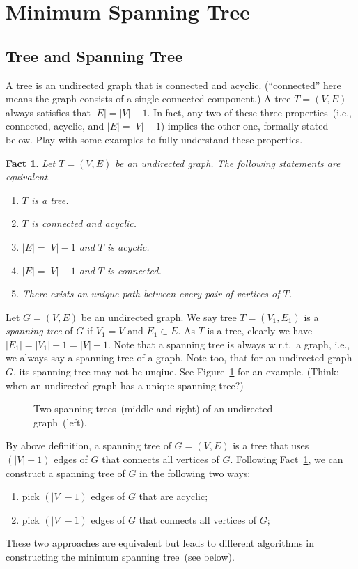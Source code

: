 \documentclass[letterpaper,11pt]{article}
\theoremstyle{mytheorem}
\newtheorem{fact}{Fact}
\begin{document}
\section*{Minimum Spanning Tree}

\subsection*{Tree and Spanning Tree}

A tree is an undirected graph that is connected and acyclic.
(``connected'' here means the graph consists of a single connected component.)
A tree $T = (V, E)$ always satisfies that $|E| = |V| - 1$.
In fact, any two of these three properties~(i.e., connected, acyclic, and $|E| = |V| - 1$)
implies the other one, formally stated below. Play with some examples
to fully understand these properties.

\begin{fact}\label{fact1}
Let $T = (V, E)$ be an undirected graph. The following statements are equivalent.
\vspace*{-\topsep}
\begin{enumerate}
\item $T$ is a tree.
\item $T$ is connected and acyclic.
\item $|E| = |V| - 1$ and $T$ is acyclic.
\item $|E| = |V| - 1$ and $T$ is connected.
\item There exists an unique path between every pair of vertices of $T$.
\end{enumerate}
\end{fact}

Let $G = (V,E)$ be an undirected graph.
We say tree $T = (V_1, E_1)$ is a \emph{spanning tree}
of $G$ if $V_1 = V$ and $E_1\subset E$.
As $T$ is a tree, clearly we have $|E_1| = |V_1| - 1 = |V| - 1$.
Note that a spanning tree is always w.r.t.\ a graph, i.e., we always
say a spanning tree of a graph. Note too, that for an undirected graph $G$, 
its spanning tree may not be unqiue. See Figure~\ref{fig:spanning}
for an example.  (Think: when an undirected graph has a unique spanning tree?)

\begin{figure}[h]
\centering{}
\caption{Two spanning trees~(middle and right) of an undirected graph~(left).}
\label{fig:spanning}
\end{figure}

By above definition, a spanning tree of $G = (V,E)$ is a tree that uses $(|V| - 1)$ edges
of $G$ that connects all vertices of $G$.
Following Fact~\ref{fact1}, we can construct a spanning tree of $G$
in the following two ways:
\vspace*{-\topsep}
\begin{enumerate}
\item pick $(|V|-1)$ edges of $G$ that are acyclic;
\item pick $(|V|-1)$ edges of $G$ that connects all vertices of $G$;
\end{enumerate}
These two approaches are equivalent but leads to different algorithms
in constructing the minimum spanning tree~(see below).
\end{document}
